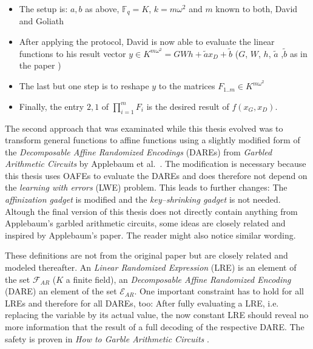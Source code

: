 \begin{itemize}

\item The setup is: $a, b$ as above, $\mathbb{F}_q = K$, $k = m\omega^2$ and $m$
known to both, David and Goliath

\item After applying the protocol, David is now able to evaluate the linear
functions to his result vector $y \in K^{m\omega^2} = GWh + \tilde{a}x_D +
\tilde{b}$ ($G$, $W$, $h$, $\tilde{a}$ ,$\tilde{b}$ as in the paper
\cite{davidgoliath})

\item The last but one step is to reshape $y$ to the matrices $F_{1..m}
\in K^{m\omega^2}$

\item Finally, the entry $2, 1$ of $\prod_{i=1}^m F_i$ is the desired result of
$f(x_G,x_D)$.

\end{itemize}


%
%
\label{sec:dare}

The second approach that was examinated while this thesis evolved was to
transform general functions to affine functions using a slightly modified form
of the \emph{Decomposable Affine Randomized Encodings} (DAREs) from
\emph{Garbled Arithmetic Circuits} by Applebaum et al.\ \cite{gac2012}. The
modification is necessary because this thesis uses OAFEs to evaluate the DAREs
and does therefore not depend on the \emph{learning with errors} (LWE) problem.
This leads to further changes: The \emph{affinization gadget} \cite{gac2012} is
modified and the \emph{key--shrinking gadget} \cite{gac2012} is not needed.
Altough the final version of this thesis does not directly contain anything from
Applebaum's garbled arithmetic circuits, some ideas are closely related and
inspired by Applebaum's paper. The reader might also notice similar wording.


\label{sec:affinization_definitions}

These definitions are not from the original paper but are closely related and
modeled thereafter. An \emph{Linear Randomized Expression} (LRE) is an element
of the set $\mathcal{F}_{AR}$ ($K$ a finite field), an \emph{Decomposable Affine
Randomized Encoding} (DARE) an element of the set $\mathcal{E}_{AR}$. One
important constraint has to hold for all LREs and therefore for all DAREs, too:
After fully evaluating a LRE, i.e. replacing the variable by its actual value,
the now constant LRE should reveal no more information that the result of a full
decoding of the respective DARE. The safety is proven in \emph{How to Garble
Arithmetic Circuits} \cite{gac2012}.

